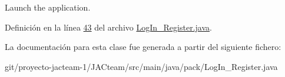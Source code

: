 Launch the application. 

Definición en la línea \mbox{\hyperlink{_log_in___register_8java_source_l00043}{43}} del archivo \mbox{\hyperlink{_log_in___register_8java_source}{Log\+In\+\_\+\+Register.\+java}}.



La documentación para esta clase fue generada a partir del siguiente fichero\+:\begin{DoxyCompactItemize}
\item 
git/proyecto-\/jacteam-\/1/\+J\+A\+Cteam/src/main/java/pack/Log\+In\+\_\+\+Register.\+java\end{DoxyCompactItemize}
